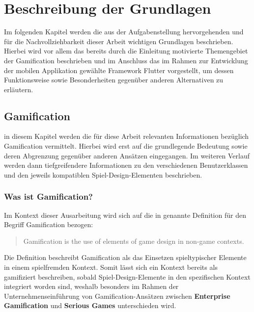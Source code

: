 \documentclass[bibliography=totoc,listof=totoc,BCOR=5mm,DIV=12,oneside]{scrbook}
\begin{document}
\newpage

\newpage
\chapter{Beschreibung der Grundlagen}
\label{chap:grundlagen}
\par Im folgenden Kapitel werden die aus der Aufgabenstellung hervorgehenden und für die Nachvollziehbarkeit dieser Arbeit wichtigen Grundlagen beschrieben. Hierbei wird vor allem das bereits durch die Einleitung motivierte Themengebiet der Gamification beschrieben und im Anschluss das im Rahmen zur Entwicklung der mobilen Applikation gewählte Framework Flutter vorgestellt, um dessen Funktionsweise sowie Besonderheiten gegenüber anderen Alternativen zu erläutern.

\section{Gamification} 
\label{sec:grundlagenkapitelGamification}
\par in diesem Kapitel werden die für diese Arbeit relevanten Informationen bezüglich Gamification vermittelt. Hierbei wird erst auf die grundlegende Bedeutung sowie deren Abgrenzung gegenüber anderen Ansätzen eingegangen. Im weiteren Verlauf werden dann tiefgreifendere Informationen zu den verschiedenen Benutzerklassen und den jeweils kompatiblen Spiel-Design-Elementen beschrieben.

\subsection{Was ist Gamification?}
\par Im Kontext dieser Ausarbeitung wird sich auf die in \citep{deterding2011gamification} genannte Definition für den Begriff \grqq Gamification\grqq{} bezogen:
\begin{quotation} 
Gamification is the use of elements of game design in non-game contexts. 
\end{quotation}
\par Die Definition beschreibt Gamification als das Einsetzen spieltypischer Elemente in einem spielfremden Kontext. Somit lässt sich ein Kontext bereits als \grqq gamifiziert\grqq{} beschreiben, sobald Spiel-Design-Elemente in den spezifischen Kontext integriert worden sind, weshalb besonders im Rahmen der Unternehmenseinführung von Gamification-Ansätzen zwischen \textbf{Enterprise Gamification} und \textbf{Serious Games} unterschieden wird. \citep[vgl. Kapitel 1.1 Gamification: Definition und Abgrenzung, Seite 4]{Sailer2016}
\end{document}

